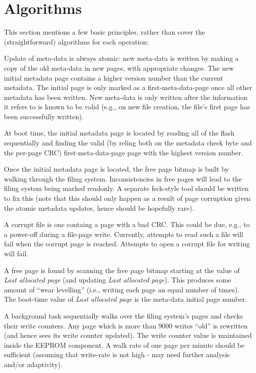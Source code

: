 \documentclass{article}
\begin{document}
\section{Algorithms}

This section mentions a few basic principles, rather than cover the
(straightforward) algorithms for each operation:

Update of meta-data is always atomic: new meta-data is written by making a
copy of the old meta-data in new pages, with appropriate changes. The new
initial metadata page contains a higher version number than the current
metadata. The initial page is only marked as a first-meta-data-page once
all other metadata has been written. New meta-data is only written after the
information it refers to is known to be valid (e.g., on new file creation,
the file's first page has been successfully written).

At boot time, the initial metadata page is located by reading all of the
flash sequentially and finding the valid (by reling both on the metadata
check byte and the per-page CRC) first-meta-data-page page with the highest
version number.

Once the initial metadata page is located, the free page bitmap is built by
walking through the filing system. Inconsistencies in free pages will lead
to the filing system being marked readonly. A separate fsck-style tool
should be written to fix this (note that this should only happen as a
result of page corruption given the atomic metadata updates, hence should
be hopefully rare).

A corrupt file is one containg a page with a bad CRC. This could be due,
e.g., to a power-off during a file-page write. Currently, attempts to
read such a file will fail when the corrupt page is reached. Attempts
to open a corrupt file for writing will fail.

A free page is found by scanning the free page bitmap starting at the value
of \emph{Last allocated page} (and updating \emph{Last allocated
page}). This produces some amount of ``wear levelling'' (i.e., writing each
page an equal number of times). The boot-time value of \emph{Last allocated
page} is the meta-data initial page number.

A background task sequentially walks over the filing system's pages
and checks their write counters. Any page which is more than 9000
writes ``old'' is rewritten (and hence sees its write counter updated).
The write counter value is maintained inside the EEPROM component.
A walk rate of one page per minute should be sufficient (assuming
that write-rate is not high - may need further analysis and/or
adaptivity).
\end{document}
